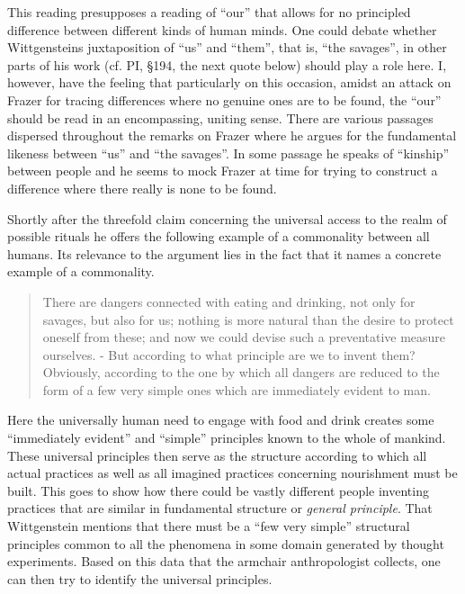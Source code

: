 \documentclass{article}
\begin{document}
This reading presupposes a reading of ``our'' that allows for no principled difference between different kinds of human minds. One could debate whether Wittgensteins juxtaposition of ``us'' and ``them'', that is, ``the savages'', in other parts of his work (cf. PI, §194, the next quote below) should play a role here. I, however, have the feeling that particularly on this occasion, amidst an attack on Frazer for tracing differences where no genuine ones are to be found, the ``our'' should be read in an encompassing, uniting sense. There are various passages dispersed throughout the remarks on Frazer where he argues for the fundamental likeness between ``us'' and ``the savages''. In some passage he speaks of ``kinship'' between people and he seems to mock Frazer at time for trying to construct a difference where there really is none to be found. 

Shortly after the threefold claim concerning the universal access to the realm of possible rituals he offers the following example of a commonality between all humans. Its relevance to the argument lies in the fact that it names a concrete example of a commonality. 
\begin{quote}
There are dangers connected with eating and drinking, not only for savages, but also for us; nothing is more natural than the desire to protect oneself from these; and now we could devise such a preventative measure ourselves. - But according to what principle are we to invent them? Obviously, according to the one by which all dangers are reduced to the form of a few very simple ones which are immediately evident to man. %
\end{quote} 
Here the universally human need to engage with food and drink creates some ``immediately evident'' and ``simple'' principles known to the whole of mankind. These universal principles then serve as the structure according to which all actual practices as well as all imagined practices concerning nourishment must be built. This goes to show how there could be vastly different people inventing practices that are similar in fundamental structure or \textit{general principle}. That Wittgenstein mentions that there must be a ``few very simple'' structural principles common to all the phenomena in some domain generated by thought experiments. Based on this  data that the armchair anthropologist collects, one can then try to identify the universal principles.
\end{document}
